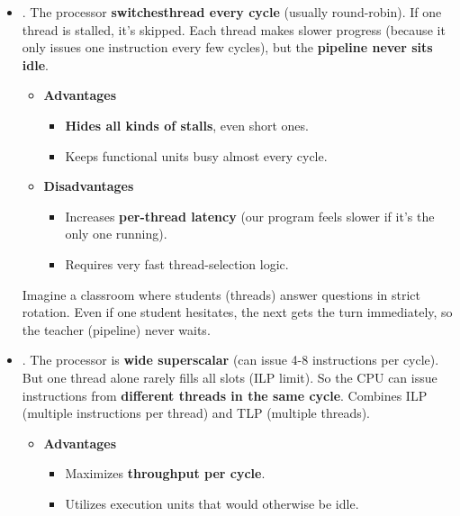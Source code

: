 \begin{itemize}
    \item {}. The processor \textbf{switches\break thread every cycle} (usually round-robin). If one thread is stalled, it's skipped. Each thread makes slower progress (because it only issues one instruction every few cycles), but the \textbf{pipeline never sits idle}.
    \begin{itemize}
        \item[\textcolor{Green3}{\faIcon{check-circle}}] \textcolor{Green3}{\textbf{Advantages}}
        \begin{itemize}
            \item[\textcolor{Green3}{\faIcon{check}}] \textbf{Hides all kinds of stalls}, even short ones.
            \item[\textcolor{Green3}{\faIcon{check}}] Keeps functional units busy almost every cycle.
        \end{itemize}

        \item[\textcolor{Red2}{\faIcon{times-circle}}] \textcolor{Red2}{\textbf{Disadvantages}}
        \begin{itemize}
            \item[\textcolor{Red2}{\faIcon{times}}] Increases \textbf{per-thread latency} (our program feels slower if it's the only one running).
            \item[\textcolor{Red2}{\faIcon{times}}] Requires very fast thread-selection logic.
        \end{itemize}
    \end{itemize}

    \begin{examplebox}
        Imagine a classroom where students (threads) answer questions in strict rotation. Even if one student hesitates, the next gets the turn immediately, so the teacher (pipeline) never waits.
    \end{examplebox}


    \item {}. The processor is \textbf{wide superscalar} (can issue 4-8 instructions per cycle). But one thread alone rarely fills all slots (ILP limit). So the CPU can issue instructions from \textbf{different threads in the same cycle}. Combines ILP (multiple instructions per thread) and TLP (multiple threads).
    \begin{itemize}
        \item[\textcolor{Green3}{\faIcon{check-circle}}] \textcolor{Green3}{\textbf{Advantages}}
        \begin{itemize}
            \item[\textcolor{Green3}{\faIcon{check}}] Maximizes \textbf{throughput per cycle}.
            \item[\textcolor{Green3}{\faIcon{check}}] Utilizes execution units that would otherwise be idle.
        \end{itemize}


\end{itemize}
\end{itemize}
